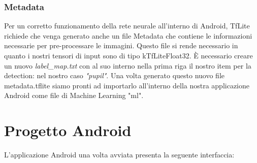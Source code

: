 \documentclass[11pt]{article}
\begin{document}
\subsubsection{Metadata}
Per un corretto funzionamento della rete neurale all'interno di Android, TfLite richiede che venga generato anche un file Metadata che contiene le informazioni necessarie per pre-processare le immagini. Questo file si rende necessario in quanto i nostri tensori di input sono di tipo kTfLiteFloat32. È necessario creare un nuovo \textit{label\_map.txt} con al suo interno nella prima riga il nostro item per la detection: nel nostro caso \textit{"pupil"}.
\newline
Una volta generato questo nuovo file metadata.tflite siamo pronti ad importarlo all'interno della nostra applicazione Android come file di Machine Learning "ml".

\newpage
\section{Progetto Android}
L'applicazione Android una volta avviata presenta la seguente interfaccia:
\end{document}

